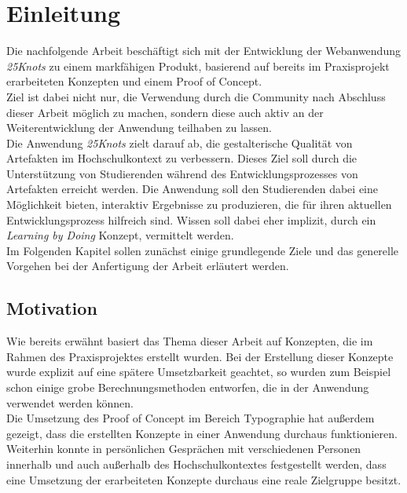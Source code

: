 \chapter{Einleitung}
\thispagestyle{fancy}
Die nachfolgende Arbeit beschäftigt sich mit der Entwicklung der Webanwendung \textit{25Knots} zu einem markfähigen Produkt, basierend auf bereits im Praxisprojekt erarbeiteten Konzepten und einem Proof of Concept.\\
Ziel ist dabei nicht nur, die Verwendung durch die Community\footnotemark{} nach Abschluss dieser Arbeit möglich zu machen, sondern diese auch aktiv an der Weiterentwicklung der Anwendung teilhaben zu lassen.\\

Die Anwendung \textit{25Knots} zielt darauf ab, die gestalterische Qualität von Artefakten im Hochschulkontext zu verbessern. Dieses Ziel soll durch die Unterstützung von Studierenden während des Entwicklungsprozesses von Artefakten erreicht werden. Die Anwendung soll den Studierenden dabei eine Möglichkeit bieten, interaktiv Ergebnisse zu produzieren, die für ihren aktuellen Entwicklungsprozess hilfreich sind. Wissen soll dabei eher implizit, durch ein \textit{Learning by Doing} Konzept, vermittelt werden.\\

Im Folgenden Kapitel sollen zunächst einige grundlegende Ziele und das generelle Vorgehen bei der Anfertigung der Arbeit erläutert werden.


\section{Motivation}
Wie bereits erwähnt basiert das Thema dieser Arbeit auf Konzepten, die im Rahmen des Praxisprojektes  erstellt wurden. Bei der Erstellung dieser Konzepte wurde explizit auf eine spätere Umsetzbarkeit geachtet, so wurden zum Beispiel schon einige grobe Berechnungsmethoden entworfen, die in der Anwendung verwendet werden können.\\
Die Umsetzung des Proof of Concept im Bereich Typographie hat außerdem gezeigt, dass die erstellten Konzepte in einer Anwendung durchaus funktionieren.\\
Weiterhin konnte in persönlichen Gesprächen mit verschiedenen Personen innerhalb und auch außerhalb des Hochschulkontextes festgestellt werden, dass eine Umsetzung der erarbeiteten Konzepte durchaus eine reale Zielgruppe besitzt.\\


